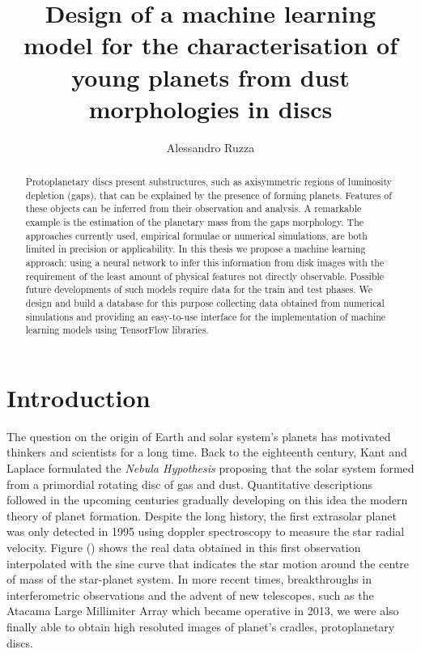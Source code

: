 \documentclass[a4paper,10pt]{report}
\title{Design of a machine learning model for the characterisation of young planets from dust morphologies in discs}
\author{Alessandro Ruzza}
\begin{document}


\begin{abstract}
    Protoplanetary discs present substructures,
    such as axisymmetric regions of luminosity depletion (gaps),
    that can be explained by the presence of forming planets. 
    Features of these objects can be inferred from their
    observation and analysis. A remarkable example is the 
    estimation of the planetary mass from the gaps morphology.
    The approaches currently used, empirical formulae or numerical
    simulations, are both limited in precision or applicability.
    In this thesis we propose a machine learning approach:
    using a neural network to infer this information from 
    disk images with the requirement of the least amount
    of physical features not directly observable.
    Possible future developments of such models require 
    data for the train and test phases.
    We design and build a database for this purpose collecting 
    data obtained from numerical simulations and providing an 
    easy-to-use interface for the implementation of machine learning
    models using TensorFlow libraries.
\end{abstract}

\tableofcontents

\chapter{Introduction}

The question on the origin of Earth and solar system's planets has motivated 
thinkers and scientists for a long time.
Back to the eighteenth century, Kant and Laplace formulated the
\emph{Nebula Hypothesis} proposing that the solar system
formed from a primordial rotating disc of gas and dust. Quantitative descriptions followed in the upcoming centuries 
gradually developing on this idea the modern theory of planet formation.
Despite the long history, the first extrasolar planet was only detected in 1995 using doppler spectroscopy to
measure the star radial velocity. Figure () shows the real data obtained in this first observation
interpolated with the sine curve that indicates the star motion around the centre of mass of the star-planet system.
In more recent times, breakthroughs in interferometric observations 
and the advent of new telescopes, such as the Atacama Large Millimiter Array which became operative in 2013, we were also
finally able to obtain high resoluted images of planet's
cradles, protoplanetary discs.
\end{document}
